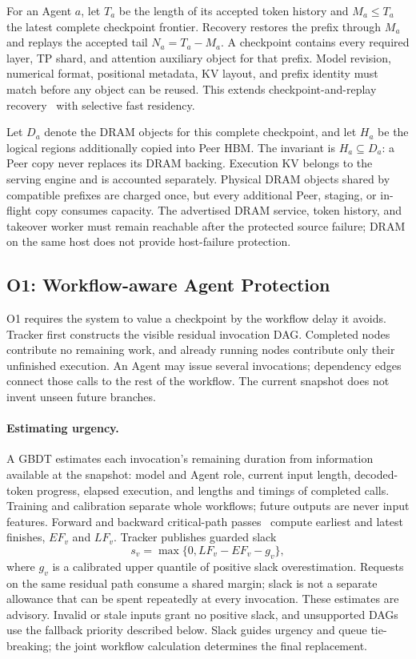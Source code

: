 For an Agent $a$, let $T_a$ be the length of its accepted token history
and $M_a\le T_a$ the latest complete checkpoint frontier. Recovery restores
the prefix through $M_a$ and replays the accepted tail
$N_a=T_a-M_a$. A checkpoint contains every required layer, TP shard,
and attention auxiliary object for that prefix. Model revision, numerical
format, positional metadata, KV layout, and prefix identity must match
before any object can be reused. This extends checkpoint-and-replay
recovery~\cite{strati2024dejavu,cao2026lumen} with selective fast residency.

Let $D_a$ denote the DRAM objects for this complete checkpoint, and let
$H_a$ be the logical regions additionally copied into Peer HBM. The
invariant is $H_a\subseteq D_a$: a Peer copy never replaces its DRAM
backing. Execution KV belongs to the serving engine and is accounted
separately. Physical DRAM objects shared by compatible prefixes are
charged once, but every additional Peer, staging, or in-flight copy
consumes capacity. The advertised DRAM service, token history, and
takeover worker must remain reachable after the protected source failure;
DRAM on the same host does not provide host-failure protection.

\subsection{O1: Workflow-aware Agent Protection}
\label{sec:teacher-agent-protection}

O1 requires the system to value a checkpoint by the workflow delay it
avoids. Tracker first constructs the visible residual invocation DAG.
Completed nodes contribute no remaining work, and already running nodes
contribute only their unfinished execution. An Agent may issue several
invocations; dependency edges connect those calls to the rest of the
workflow. The current snapshot does not invent unseen future branches.

\paragraph{Estimating urgency.}
A GBDT estimates each invocation's remaining duration from information
available at the snapshot: model and Agent role, current input length,
decoded-token progress, elapsed execution, and lengths and timings of
completed calls. Training and calibration separate whole workflows;
future outputs are never input features. Forward and backward
critical-path passes~\cite{kelley1959cpm} compute earliest and latest
finishes, $EF_v$ and $LF_v$. Tracker publishes guarded slack
\begin{equation}
 s_v=\max\{0,LF_v-EF_v-g_v\},
 \label{eq:teacher-slack}
\end{equation}
where $g_v$ is a calibrated upper quantile of positive slack
overestimation. Requests on the same residual path consume a shared
margin; slack is not a separate allowance that can be spent repeatedly
at every invocation. These estimates are advisory. Invalid or stale
inputs grant no positive slack, and unsupported DAGs use the fallback
priority described below. Slack guides urgency and queue tie-breaking;
the joint workflow calculation determines the final replacement.

